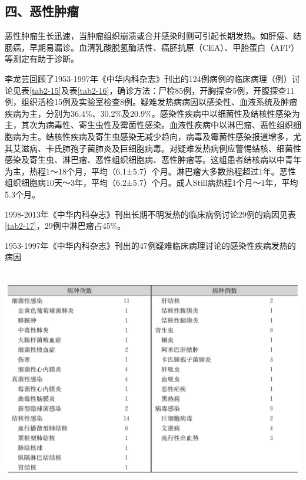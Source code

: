 \subsection{四、恶性肿瘤}

恶性肿瘤生长迅速，当肿瘤组织崩溃或合并感染时则可引起长期发热。如肝癌、结肠癌，早期易漏诊。血清乳酸脱氢酶活性、癌胚抗原（CEA）、甲胎蛋白（AFP）等测定有助于诊断。

李龙芸回顾了1953-1997年《中华内科杂志》刊出的124例病例的临床病理（例）讨论见表\ref{tab2-15}及表\ref{tab2-16}，确诊方法：尸检85例，开胸探查5例，开腹探查11例，组织活检15例及实验室检查8例。疑难发热病病因以感染性、血液系统及肿瘤疾病为主，分别为36.4\%、30.2\%及20.9\%。感染性疾病中以细菌性及结核性感染为主，其次为病毒性、寄生虫性及霉菌性感染。血液性疾病中以淋巴瘤、恶性组织细胞病为主。结核性疾病及寄生虫感染无减少趋向，病毒及霉菌性感染报道增多，尤其艾滋病、卡氏肺孢子菌肺炎及巨细胞病毒。对疑难发热病例应警惕结核、细菌性感染及寄生虫、淋巴瘤、恶性组织细胞病、恶性肿瘤等。这组患者结核病以中青年为主，热程1～18个月，平均（6.1±5.7）个月。淋巴瘤大多数热程超过1年。恶性组织细胞病10天～3年，平均（6.2±5.7）个月。成人Still病热程1个月～1年，平均5.3个月。

1998-2013年《中华内科杂志》刊出长期不明发热的临床病例讨论29例的病因见表\ref{tab2-17}，29例中淋巴瘤占45\%。

\begin{table}[htbp]
\centering
\caption{1953-1997年《中华内科杂志》刊出的47例疑难临床病理讨论的感染性疾病发热的病因}
\label{tab2-15}
\includegraphics[width=5.94792in,height=3.83333in]{./images/Image00021.jpg}
\end{table}

